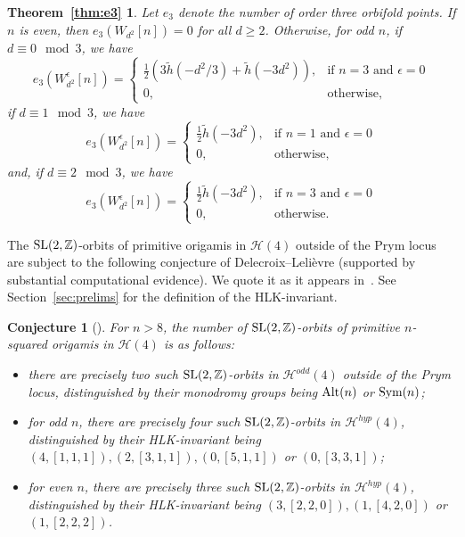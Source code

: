 \documentclass[a4paper,11pt]{amsart}
\numberwithin{equation}{section}
\numberwithin{figure}{section}
\numberwithin{table}{section}
\newtheorem{conjecture}[theorem]{Conjecture}
\newtheorem*{theorem-e3}{Theorem~\ref*{thm:e3}}
\newcommand{\calH}{\mathcal{H}}
\newcommand{\odd}{\mathcal{H}^{odd}}
\newcommand{\hyp}{\mathcal{H}^{hyp}}
\newcommand{\Z}{\mathbb{Z}}
\DeclareMathOperator{\SL}{{\rm{SL}}}
\DeclareMathOperator{\Sym}{{\rm{Sym}}}
\DeclareMathOperator{\Alt}{{\rm{Alt}}}
\begin{document}
\begin{theorem-e3}
    Let $e_{3}$ denote the number of order three orbifold points. If $n$ is even, then $e_{3}(W_{d^2}[n]) = 0$ for all $d\geq 2$. Otherwise, for odd $n$, if $d\equiv 0\!\!\mod 3$, we have
    \[e_{3}(W_{d^2}^{\epsilon}[n]) = \left\lbrace\begin{array}{cl}
        \frac{1}{2}(3\tilde{h}(-d^2/3) + \tilde{h}(-3d^2)), & \text{if $n = 3$ and $\epsilon = 0$} \\
        0, & \text{otherwise},
    \end{array}\right.\]
    if $d\equiv 1\!\!\mod 3$, we have
    \[e_{3}(W_{d^2}^{\epsilon}[n]) = \left\lbrace\begin{array}{cl}
        \frac{1}{2}\tilde{h}(-3d^2), & \text{if $n = 1$ and $\epsilon = 0$} \\
        0, & \text{otherwise},
    \end{array}\right.\]
    and, if $d\equiv 2\!\!\mod 3$, we have
    \[e_{3}(W_{d^2}^{\epsilon}[n]) = \left\lbrace\begin{array}{cl}
        \frac{1}{2}\tilde{h}(-3d^2), & \text{if $n = 3$ and $\epsilon = 0$} \\
        0, & \text{otherwise}.
    \end{array}\right.\]
\end{theorem-e3}

The $\SL(2,\Z)$-orbits of primitive origamis in $\calH(4)$ outside of the Prym locus are subject to the following conjecture of Delecroix--Leli\`evre (supported by substantial computational evidence). We quote it as it appears in~\cite{MMY}. See Section~\ref{sec:prelims} for the definition of the HLK-invariant.

\begin{conjecture}[{\cite[Conjecture 6.8]{MMY}}]\label{conj:Del-Lel}
    For $n > 8$, the number of $\SL(2,\Z)$-orbits of primitive $n$-squared origamis in $\calH(4)$ is as follows:
    \begin{itemize}
        \item there are precisely two such $\SL(2,\Z)$-orbits in $\odd(4)$ outside of the Prym locus, distinguished by their monodromy groups being $\Alt(n)$ or $\Sym(n)$;
        \item for odd $n$, there are precisely four such $\SL(2,\Z)$-orbits in $\hyp(4)$, distinguished by their HLK-invariant being $(4,[1,1,1]), (2,[3,1,1]), (0,[5,1,1])$ or $(0,[3,3,1])$;
        \item for even $n$, there are precisely three such $\SL(2,\Z)$-orbits in $\hyp(4)$, distinguished by their HLK-invariant being $(3,[2,2,0]), (1,[4,2,0])$ or $(1,[2,2,2])$.
    \end{itemize}
\end{conjecture}
\end{document}
